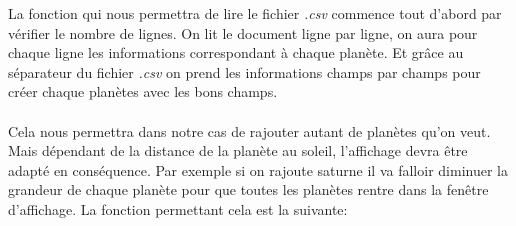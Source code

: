 \documentclass[a4paper,10pt]{article}
\begin{document}
    La fonction qui nous permettra de lire le fichier \emph{.csv} commence tout d'abord par vérifier le nombre de lignes. On lit le document ligne par ligne, on aura pour chaque ligne les informations correspondant à chaque planète.
    Et grâce au séparateur du fichier \emph{.csv} on prend les informations champs par champs pour créer chaque planètes avec les bons champs. \\\\Cela nous permettra dans notre cas de rajouter autant de planètes qu'on veut. Mais 
    dépendant de la distance de la planète au soleil, l'affichage devra être adapté en conséquence. Par exemple si on rajoute saturne il va falloir diminuer la grandeur de chaque planète pour que toutes les planètes rentre dans la fenêtre 
    d'affichage.
    La fonction permettant cela est la suivante:
\end{document}
